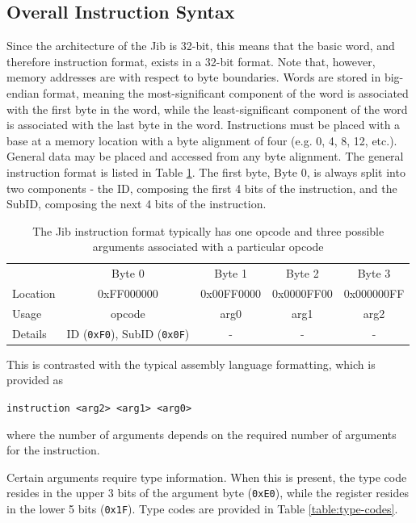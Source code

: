 \documentclass{article}
\begin{document}
\subsection{Overall Instruction Syntax}

Since the architecture of the Jib is 32-bit, this means that the basic word, and therefore instruction format, exists in a 32-bit format. Note that, however, memory addresses are with respect to byte boundaries. Words are stored in big-endian format, meaning the most-significant component of the word is associated with the first byte in the word, while the least-significant component of the word is associated with the last byte in the word. Instructions must be placed with a base at a memory location with a byte alignment of four (e.g. 0, 4, 8, 12, etc.). General data may be placed and accessed from any byte alignment. The general instruction format is listed  in Table \ref{table:instruction-formatting}. The first byte, Byte 0, is always split into two components - the ID, composing the first 4 bits of the instruction, and the SubID, composing the next 4 bits of the instruction.

\begin{table}[h!]
    \centering
    \begin{tabular}{l|cccc}
        \hline
        {} & Byte 0 & Byte 1 & Byte 2 & Byte 3 \\
        Location & 0xFF000000 & 0x00FF0000 & 0x0000FF00 & 0x000000FF \\
        \hline
        Usage & opcode & arg0 & arg1 & arg2 \\
        Details & ID (\texttt{0xF0}), SubID (\texttt{0x0F}) & - & - & - \\
        \hline
    \end{tabular}
    \caption{The Jib instruction format typically has one opcode and three possible arguments associated with a particular opcode}
    \label{table:instruction-formatting}
\end{table}

This is contrasted with the typical assembly language formatting, which is provided as

\begin{center}
    \texttt{instruction <arg2> <arg1> <arg0>}
\end{center}

where the number of arguments depends on the required number of arguments for the instruction.

Certain arguments require type information. When this is present, the type code resides in the upper 3 bits of the argument byte (\texttt{0xE0}), while the register resides in the lower 5 bits (\texttt{0x1F}). Type codes are provided in Table \ref{table:type-codes}.
\end{document}
